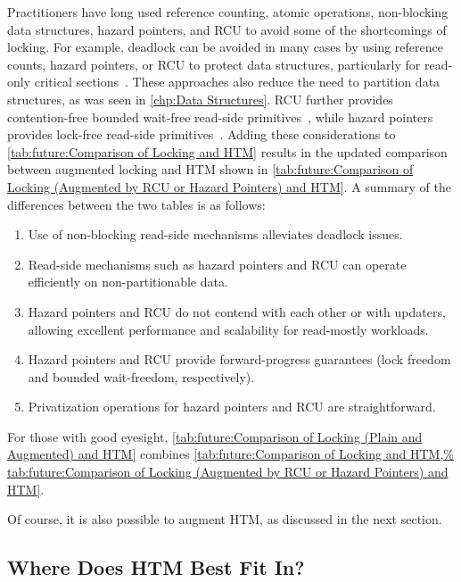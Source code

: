 Practitioners have long used reference counting, atomic operations,
non-blocking data structures, hazard pointers, and RCU to avoid some
of the shortcomings of locking.
For example, deadlock can be avoided in many cases by using reference
counts, hazard pointers, or RCU to protect data structures,
particularly for read-only critical
sections~\cite{MagedMichael04a,HerlihyLM02,MathieuDesnoyers2012URCU,DinakarGuniguntala2008IBMSysJ,ThomasEHart2007a}.
These approaches also reduce the need to partition data
structures, as was seen in \cref{chp:Data Structures}.
RCU further provides contention-free bounded wait-free read-side
primitives~\cite{McKenney98,MathieuDesnoyers2012URCU}, while hazard pointers
provides lock-free read-side
primitives~\cite{Michael02a,HerlihyLM02,MagedMichael04a}.
Adding these considerations to
\cref{tab:future:Comparison of Locking and HTM}
results in the updated comparison between augmented locking and HTM
shown in
\cref{tab:future:Comparison of Locking (Augmented by RCU or Hazard Pointers) and HTM}.
A summary of the differences between the two tables is as follows:

\begin{enumerate}
\item	Use of non-blocking read-side mechanisms alleviates deadlock issues.
\item	Read-side mechanisms such as hazard pointers and RCU can operate
	efficiently on non-partitionable data.
\item	Hazard pointers and RCU do not contend with each other or with
	updaters, allowing excellent performance and scalability for
	read-mostly workloads.
\item	Hazard pointers and RCU provide forward-progress guarantees
	(lock freedom and bounded wait-freedom, respectively).
\item	Privatization operations for hazard pointers and RCU are
	straightforward.
\end{enumerate}



For those with good eyesight,
\cref{tab:future:Comparison of Locking (Plain and Augmented) and HTM}
combines
\cref{tab:future:Comparison of Locking and HTM,%
tab:future:Comparison of Locking (Augmented by RCU or Hazard Pointers) and HTM}.

Of course, it is also possible to augment HTM,
as discussed in the next section.

\subsection{Where Does HTM Best Fit In?}
\label{sec:future:Where Does HTM Best Fit In?}

